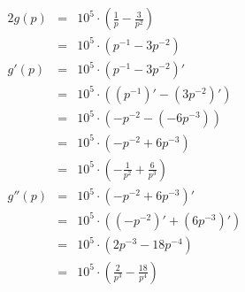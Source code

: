 \documentclass[10pt,a4paper,oneside,ngerman,numbers=noenddot]{scrartcl}
\begin{document}
\section{} %
\subsection{} %
\begin{alignat*}{2}
g(p) &=& 10^{5} \cdot \left( \frac{1}{p} - \frac{3}{p^{2}} \right) \\
&=& 10^{5} \cdot \left( p^{-1} - 3p^{-2} \right) \\
g'(p) &=& 10^{5} \cdot \left( p^{-1} - 3p^{-2} \right)' \\
&=& 10^{5} \cdot \left((p^{-1})' - (3p^{-2})' \right) \\
&=& 10^{5} \cdot \left(-p^{-2} - (-6p^{-3}) \right) \\
&=& 10^{5} \cdot \left(-p^{-2} + 6p^{-3} \right) \\
&=& 10^{5} \cdot \left(-\frac{1}{p^{2}} + \frac{6}{p^{3}} \right) \\
g''(p) &=& 10^{5} \cdot \left(-p^{-2} + 6p^{-3} \right)' \\
&=& 10^{5} \cdot \left((-p^{-2})' + (6p^{-3})' \right) \\
&=& 10^{5} \cdot \left(2p^{-3} - 18p^{-4} \right) \\
&=& 10^{5} \cdot \left(\frac{2}{p^{3}} - \frac{18}{p^{4}} \right)
\end{alignat*}
\end{document}
